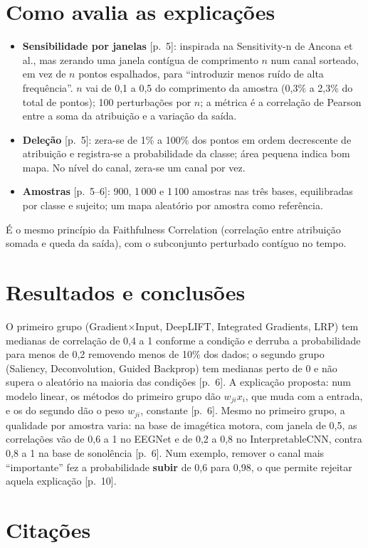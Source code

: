 \documentclass[11pt,a4paper]{article}
\begin{document}
\section{Como avalia as explicações}
\begin{itemize}
\item \textbf{Sensibilidade por janelas} [p.~5]: inspirada na Sensitivity-n de Ancona et al., mas zerando uma janela contígua de comprimento $n$ num canal sorteado, em vez de $n$ pontos espalhados, para ``introduzir menos ruído de alta frequência''. $n$ vai de 0,1 a 0,5 do comprimento da amostra (0,3\% a 2,3\% do total de pontos); 100 perturbações por $n$; a métrica é a correlação de Pearson entre a soma da atribuição e a variação da saída.
\item \textbf{Deleção} [p.~5]: zera-se de 1\% a 100\% dos pontos em ordem decrescente de atribuição e registra-se a probabilidade da classe; área pequena indica bom mapa. No nível do canal, zera-se um canal por vez.
\item \textbf{Amostras} [p.~5--6]: 900, 1\,000 e 1\,100 amostras nas três bases, equilibradas por classe e sujeito; um mapa aleatório por amostra como referência.
\end{itemize}
É o mesmo princípio da Faithfulness Correlation (correlação entre atribuição somada e queda da saída), com o subconjunto perturbado contíguo no tempo.

\section{Resultados e conclusões}
O primeiro grupo (Gradient$\times$Input, DeepLIFT, Integrated Gradients, LRP) tem medianas de correlação de 0,4 a 1 conforme a condição e derruba a probabilidade para menos de 0,2 removendo menos de 10\% dos dados; o segundo grupo (Saliency, Deconvolution, Guided Backprop) tem medianas perto de 0 e não supera o aleatório na maioria das condições [p.~6]. A explicação proposta: num modelo linear, os métodos do primeiro grupo dão $w_{ji}x_i$, que muda com a entrada, e os do segundo dão o peso $w_{ji}$, constante [p.~6]. Mesmo no primeiro grupo, a qualidade por amostra varia: na base de imagética motora, com janela de 0,5, as correlações vão de 0,6 a 1 no EEGNet e de 0,2 a 0,8 no InterpretableCNN, contra 0,8 a 1 na base de sonolência [p.~6]. Num exemplo, remover o canal mais ``importante'' fez a probabilidade \textbf{subir} de 0,6 para 0,98, o que permite rejeitar aquela explicação [p.~10].

\section{Citações}
\end{document}
